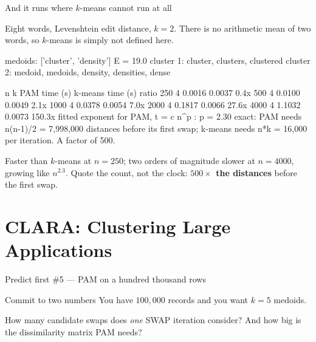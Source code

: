 \documentclass[aspectratio=169]{beamer}
\begin{document}
\begin{frame}[fragile,shrink=6]{And it runs where $k$-means cannot run at all}
  \begin{center}\small
    Eight words, Levenshtein edit distance, $k = 2$. There is no arithmetic
    mean of two words, so $k$-means is simply not defined here.
  \end{center}
\begin{outblk}
  medoids: ['cluster', 'density']   E = 19.0
  cluster 1: cluster, clusters, clustered
  cluster 2: medoid, medoids, density, densities, dense
\end{outblk}
  \vspace{0.3em}
\begin{outblk}
     n    k   PAM time (s)   k-means time (s)    ratio
   250    4        0.0016            0.0037           0.4x
   500    4        0.0100            0.0049           2.1x
  1000    4        0.0378            0.0054           7.0x
  2000    4        0.1817            0.0066          27.6x
  4000    4        1.1032            0.0073         150.3x
  fitted exponent for PAM,  t = c n^p :  p = 2.30
  exact: PAM needs n(n-1)/2 = 7,998,000 distances before its first swap;
         k-means needs n*k = 16,000 per iteration.  A factor of 500.
\end{outblk}
  \vspace{0.1em}
  \begin{center}\small
    Faster than $k$-means at $n = 250$; two orders of magnitude slower at
    $n = 4000$, growing like $n^{2.3}$. Quote the count, not the clock:
    \textbf{$500\times$ the distances} before the first swap.
  \end{center}
\end{frame}

\section[CLARA]{CLARA: Clustering Large Applications}
\label{sec:clara}

\begin{frame}{Predict first \#5 --- PAM on a hundred thousand rows}
  \begin{alertblock}{Commit to two numbers}
    You have $100{,}000$ records and you want $k = 5$ medoids.

    \medskip
    \centering\large
    How many candidate swaps does \emph{one} SWAP iteration consider?
    And how big is the dissimilarity matrix PAM needs?
  \end{alertblock}
\end{frame}
\end{document}
